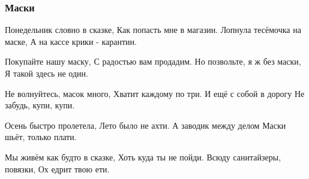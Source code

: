  
 
 

\subsubsection{Маски}

Понедельник словно в сказке,
Как попасть мне в магазин.
Лопнула тесёмочка на маске,
А на кассе крики - карантин.

Покупайте нашу маску,
С радостью вам продадим.
Но позвольте, я ж без маски,
Я такой здесь не один.

Не волнуйтесь, масок много,
Хватит каждому по три.
И ещё с собой в дорогу
Не забудь, купи, купи.

Осень быстро пролетела, 
Лето было не ахти. 
А заводик между делом
Маски шьёт, только плати.

Мы живём как будто в сказке,
Хоть куда ты не пойди.
Всюду санитайзеры, повязки,
Ох едрит твою ети.

